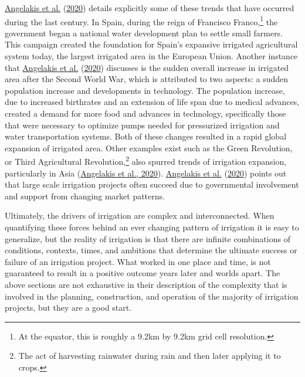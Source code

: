 \documentclass[12pt,twoside]{reedthesis}
\begin{document}
\protect\hyperlink{ref-angelakisIrrigationWorldAgricultural2020}{Angelakis et al.} (\protect\hyperlink{ref-angelakisIrrigationWorldAgricultural2020}{2020}) details explicitly some of these trends that have occurred during the last century. In Spain, during the reign of Francisco Franco,\footnote{At the equator, this is roughly a 9.2km by 9.2km grid cell resolution.} the government began a national water development plan to settle small farmers. This campaign created the foundation for Spain's expansive irrigated agricultural system today, the largest irrigated area in the European Union. Another instance that \protect\hyperlink{ref-angelakisIrrigationWorldAgricultural2020}{Angelakis et al.} (\protect\hyperlink{ref-angelakisIrrigationWorldAgricultural2020}{2020}) discusses is the sudden overall increase in irrigated area after the Second World War, which is attributed to two aspects: a sudden population increase and developments in technology. The population increase, due to increased birthrates and an extension of life span due to medical advances, created a demand for more food and advances in technology, specifically those that were necessary to optimize pumps needed for pressurized irrigation and water transportation systems. Both of these changes resulted in a rapid global expansion of irrigated area. Other examples exist such as the Green Revolution, or Third Agricultural Revolution,\footnote{The act of harvesting rainwater during rain and then later applying it to crops.} also spurred trends of irrigation expansion, particularly in Asia (\protect\hyperlink{ref-angelakisIrrigationWorldAgricultural2020}{Angelakis et al., 2020}). \protect\hyperlink{ref-angelakisIrrigationWorldAgricultural2020}{Angelakis et al.} (\protect\hyperlink{ref-angelakisIrrigationWorldAgricultural2020}{2020}) points out that large scale irrigation projects often succeed due to governmental involvement and support from changing market patterns.

\bigskip

Ultimately, the drivers of irrigation are complex and interconnected. When quantifying these forces behind an ever changing pattern of irrigation it is easy to generalize, but the reality of irrigation is that there are infinite combinations of conditions, contexts, times, and ambitions that determine the ultimate success or failure of an irrigation project. What worked in one place and time, is not guaranteed to result in a positive outcome years later and worlds apart. The above sections are not exhaustive in their description of the complexity that is involved in the planning, construction, and operation of the majority of irrigation projects, but they are a good start.
\end{document}
